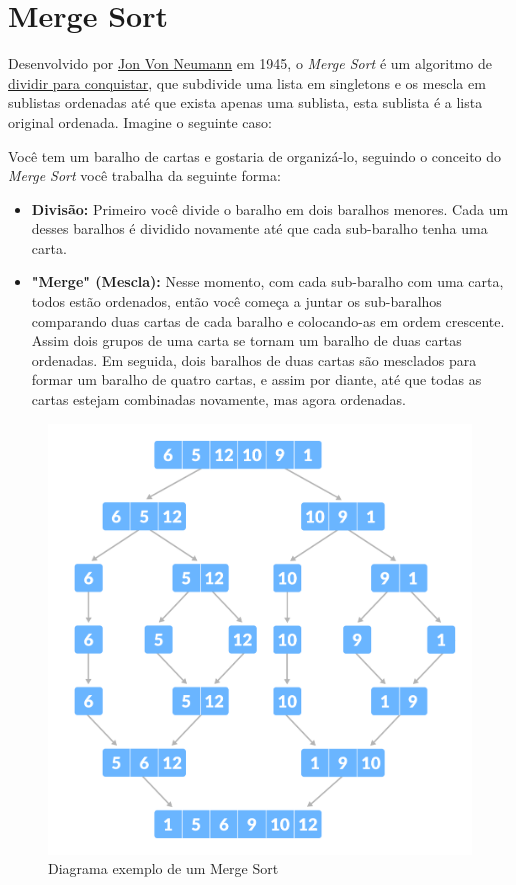 \section{Merge Sort}
\label{sec:merge-sort-teo}

Desenvolvido por \href{https://en.wikipedia.org/wiki/John_von_Neumann}{Jon Von Neumann} em 1945, o \textit{Merge Sort} é um algoritmo de \href{https://en.wikipedia.org/wiki/Divide-and-conquer_algorithm}{dividir para conquistar}, que subdivide uma lista em singletons e os mescla em sublistas ordenadas até que exista apenas uma sublista, esta sublista é a lista original ordenada. Imagine o seguinte caso:

Você tem um baralho de cartas e gostaria de organizá-lo, seguindo o conceito do \textit{Merge Sort} você trabalha da seguinte forma:
\begin{itemize}
	\item \textbf{Divisão:} Primeiro você divide o baralho em dois baralhos menores. Cada um desses baralhos é dividido novamente até que cada sub-baralho tenha uma carta.
	\item \textbf{"Merge" (Mescla):} Nesse momento, com cada sub-baralho com uma carta, todos estão ordenados, então você começa a juntar os sub-baralhos comparando duas cartas de cada baralho e colocando-as em ordem crescente. Assim dois grupos de uma carta se tornam um baralho de duas cartas ordenadas. Em seguida, dois baralhos de duas cartas são mesclados para formar um baralho de quatro cartas, e assim por diante, até que todas as cartas estejam combinadas novamente, mas agora ordenadas.
\end{itemize}
\begin{figure}[!ht]
	\centering
	\includegraphics[scale=0.4]{figures/merge-sort-example_0.png}
	\caption{Diagrama exemplo de um Merge Sort}
	\label{fig:merge_sort_example_0}
\end{figure}

